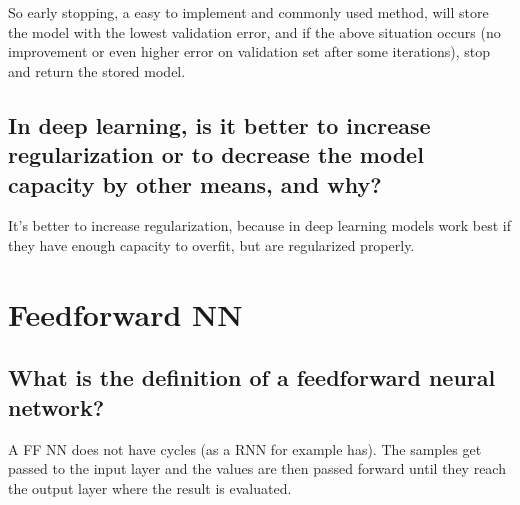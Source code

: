 So early stopping, a easy to implement and commonly used method, will store the model with the lowest validation error, and if the above situation occurs (no improvement or even higher error on validation set after some iterations), stop and return the stored model.

\subsection{In deep learning, is it better to increase regularization or to decrease the model capacity by other means, and why?}
It's better to increase regularization, because in deep learning models work best if they have enough capacity to overfit, but are regularized properly.

\section{Feedforward NN}
\subsection{What is the definition of a feedforward neural network?}
A FF NN does not have cycles (as a RNN for example has). The samples get passed to the input layer and the values are then passed forward until they reach the output layer where the result is evaluated.
